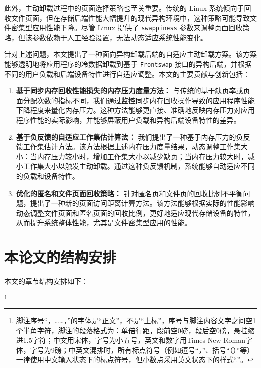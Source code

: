 此外，主动卸载过程中的页面选择策略也至关重要。传统的 Linux 系统倾向于回收文件页面，但在存储后端性能大幅提升的现代异构环境中，这种策略可能导致文件密集型应用性能下降。尽管 Linux 提供了 \texttt{swappiness} 参数来调整页面回收策略，但该参数依赖于人工经验设置，无法动态适应系统性能变化。

针对上述问题，本文提出了一种面向异构卸载后端的自适应主动卸载方案。该方案能够透明地将应用程序的冷数据卸载到基于 \texttt{Frontswap} 接口的异构后端，并根据不同的用户负载和后端设备特性进行自适应调整。本文的主要贡献与创新包括：

\begin{enumerate}
    \item \textbf{基于同步内存回收性能损失的内存压力度量方法：} 与传统的基于缺页率或页面分配次数的指标不同，我们通过监控同步内存回收操作导致的应用程序性能下降程度来量化内存压力。这种方法能够更直接、准确地反映内存压力对应用程序性能的实际影响，并能够屏蔽用户负载和异构后端设备特性的差异。

    \item \textbf{基于负反馈的自适应工作集估计算法：} 我们提出了一种基于内存压力的负反馈工作集估计方法。该方法根据上述内存压力度量结果，动态调整工作集大小：当内存压力较小时，增加工作集大小以减少缺页；当内存压力较大时，减小工作集大小以触发主动卸载。通过这种负反馈机制，系统能够自动适应不同的负载和设备特性。

    \item \textbf{优化的匿名和文件页面回收策略：} 针对匿名页和文件页的回收比例不平衡问题，提出了一种新的页面访问距离计算方法。该方法能够根据实际的性能影响动态调整文件页面和匿名页面的回收比例，更好地适应现代存储设备的特性，从而提升系统整体性能，尤其是文件密集型应用的性能。
\end{enumerate}

\section{本论文的结构安排}
本文的章节结构安排如下：

\footnote{脚注序号“，……，”的字体是“正文”，不是“上标”，序号与脚注内容文字之间空1个半角字符，脚注的段落格式为：单倍行距，段前空0磅，段后空0磅，悬挂缩进1.5字符；中文用宋体，字号为小五号，英文和数字用Times New Roman字体，字号为9磅；中英文混排时，所有标点符号（例如逗号“，”、括号“（）”等）一律使用中文输入状态下的标点符号，但小数点采用英文状态下的样式“.”。}